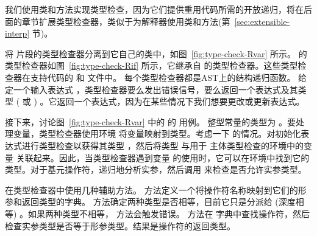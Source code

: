\documentclass[11pt]{book}
\begin{document}
我们使用类和方法实现类型检查，因为它们提供重用代码所需的开放递归，将在后面的章节扩展类型检查器，类似于为解释器使用类和方法(第~\ref{sec:extensible-interp} 节)。

将 \LangVar{} 片段的类型检查器分离到它自己的类中，如图~\ref{fig:type-check-Rvar} 所示。
\LangIf{} 的类型检查器如图~\ref{fig:type-check-Rif} 所示，它继承自 \LangVar{} 的类型检查器。这些类型检查器在支持代码的  和  文件中。
%
每个类型检查器都是AST上的结构递归函数。
给定一个输入表达式  ，类型检查器要么发出错误信号，要么返回一个表达式及其类型 ( 或
) 。它返回一个表达式，因为在某些情况下我们想要更改或更新表达式。

接下来，讨论图~\ref{fig:type-check-Rvar} 中的  的  用例。
整型常量的类型为
 。要处理变量，类型检查器使用环境  将变量映射到类型。考虑一下  的情况。对初始化表达式进行类型检查以获得其类型  ，然后将类型  与用于  主体类型检查的环境中的变量
 关联起来。因此，当类型检查器遇到变量
 的使用时，它可以在环境中找到它的类型。对于基元操作符，递归地分析实参，然后调用  来检查是否允许实参类型。

在类型检查器中使用几种辅助方法。
 方法定义一个将操作符名称映射到它们的形参和返回类型的字典。 
方法确定两种类型是否相等，目前它只是分派给   (深度相等) 。如果两种类型不相等，
 方法会触发错误。  方法在  字典中查找操作符，然后检查实参类型是否等于形参类型。结果是操作符的返回类型。
\end{document}
